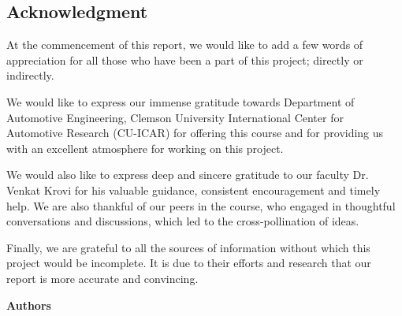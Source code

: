 \begin{titlepage}

    \pagebreak

    \section*{Acknowledgment}\label{Acknowledgment}
    \thispagestyle{empty}

    At the commencement of this report, we would like to add a few words of appreciation for all those who have been a part of this project; directly or indirectly.
    
    We would like to express our immense gratitude towards Department of Automotive Engineering, Clemson University International Center for Automotive Research (CU-ICAR) for offering this course and for providing us with an excellent atmosphere for working on this project.
    
    We would also like to express deep and sincere gratitude to our faculty Dr. Venkat Krovi for his valuable guidance, consistent encouragement and timely help. We are also thankful of our peers in the course, who engaged in thoughtful conversations and discussions, which led to the cross-pollination of ideas.
    
    Finally, we are grateful to all the sources of information without which this project would be incomplete. It is due to their efforts and research that our report is more accurate and convincing.

    \begin{flushright}
    \textbf{Authors}
    \end{flushright}

    \pagebreak

    \thispagestyle{empty}
    \tableofcontents
    \thispagestyle{empty}
    
    \pagebreak
    
\end{titlepage}
